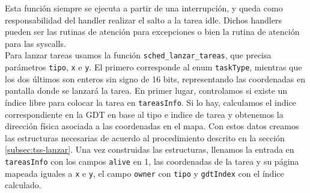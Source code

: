 Esta función siempre se ejecuta a partir de una interrupción, y queda como responsabilidad del handler realizar el salto a la tarea idle. Dichos handlers pueden ser las rutinas de atención para excepciones o bien la rutina de atención para las syscalls.\\



Para lanzar tareas usamos la función \verb|sched_lanzar_tareas|, que precisa parámetros \verb|tipo|, \verb|x| e \verb|y|. El primero corresponde al enum \verb|taskType|, mientras que los dos últimos son enteros sin signo de 16 bits, representando las coordenadas en pantalla donde se lanzará la tarea.
En primer lugar, controlamos si existe un índice libre para colocar la tarea en \verb|tareasInfo|. Si lo hay, calculamos el indice correspondiente en la GDT en base al tipo e indice de tarea y obtenemos la dirección física asociada a las coordenadas en el mapa. Con estos datos creamos las estructuras necesarias de acuerdo al procedimiento descrito en la sección \ref{subsec:tss-lanzar}.
Una vez construidas las estructuras, llenamos la entrada en \verb|tareasInfo| con los campos
\verb|alive| en 1, las coordenadas de la tarea y su página mapeada iguales a \verb|x| e \verb|y|, el campo \verb|owner| con \verb|tipo| y \verb|gdtIndex| con el índice calculado.\\






\begin{comment}
4.7.
Ejercicio 7

a) Construir una función para inicializar las estructuras de datos del scheduler.


b) Crear la función sched proximo indice() que devuelve el ındice en la GDT de la próxima
tarea a ser ejecutada. Construir la rutina de forma devuelva una tarea de cada jugador
por vez según se explica en la sección 3.2

c) Modificar la rutina de la interrupción 0x66, para que implemente los tres servicios según
se indica en la sección 3.1.1.


d) Modificar el código necesario para que se realice el intercambio de tareas por cada ciclo de
reloj. El intercambio se realizará según indique la función sched proximo indice().


e) Modificar las rutinas de excepciones del procesador para que desalojen y destruyan a la
tarea que estaba corriendo y corran la próxima.


f) Implementar el mecanismo de debugging explicado en la sección 3.4 que indicará en pan-
talla la razón del desalojo de una tarea.


Nota: Se recomienda construir funciones en C que ayuden a resolver problemas como
convertir direcciones de el mapa a direcciones fısicas o buscar la proxima tarea a ejecutar.

\end{comment}


\label{sec-desalojo}


